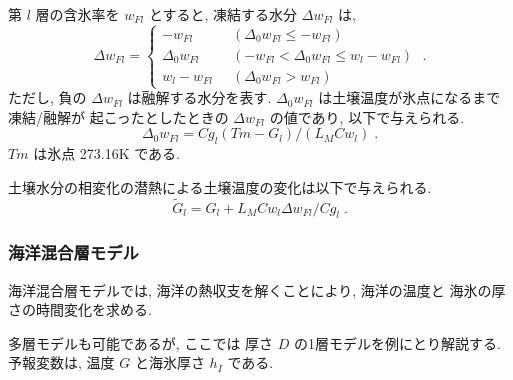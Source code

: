 第 $l$ 層の含氷率を $w_{Fl}$ とすると, 凍結する水分 $\Delta w_{Fl}$ は, 
\begin{equation}
  \Delta w_{Fl} = \left\{
    \begin{array}{ll}
      - w_{Fl}
        & \;\; ( \Delta_0 w_{Fl} \le - w_{Fl} ) \\
      \Delta_0 w_{Fl}
        & \;\; ( - w_{Fl} < \Delta_0 w_{Fl} \le w_l - w_{Fl} ) \\
      w_l - w_{Fl}
        & \;\; ( \Delta_0 w_{Fl} >  w_{Fl} )
    \end{array}
  \right. \; .
\end{equation}
ただし, 負の $\Delta w_{Fl}$ は融解する水分を表す. 
$\Delta_0 w_{Fl}$ は土壌温度が氷点になるまで凍結/融解が
起こったとしたときの $\Delta w_{Fl}$ の値であり, 以下で与えられる. 
\begin{equation}
  \Delta_0 w_{Fl} = Cg_l (Tm - G_l)/(L_M Cw_l) \; .
\end{equation}
$Tm$ は氷点 273.16K である. 

土壌水分の相変化の潜熱による土壌温度の変化は以下で与えられる. 
\begin{equation}
  \tilde{G}_l = G_l + L_M Cw_l \Delta w_{Fl} / Cg_l \; .
\end{equation}

\subsubsection{海洋混合層モデル }

海洋混合層モデルでは,
海洋の熱収支を解くことにより, 海洋の温度と
海氷の厚さの時間変化を求める.

多層モデルも可能であるが,
ここでは 厚さ $D$ の1層モデルを例にとり解説する.
予報変数は, 温度 $G$ と海氷厚さ $h_I$ である.

